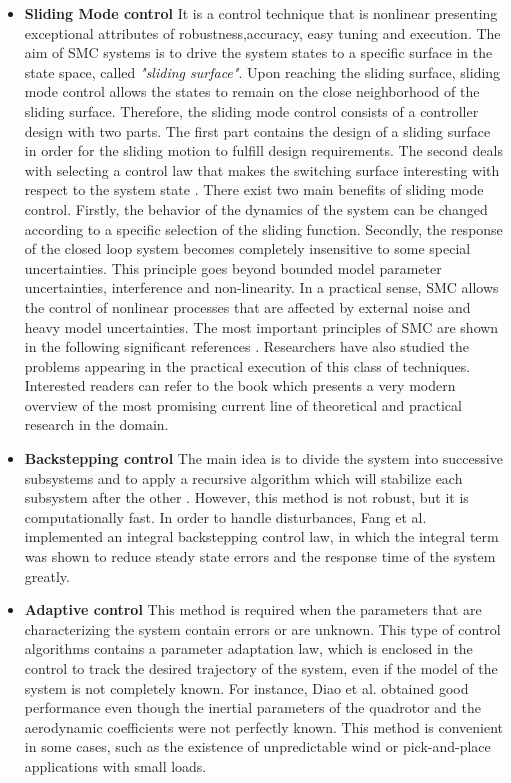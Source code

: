 \documentclass{thesisreport}
\begin{document}
\begin{itemize}
\setlength{\itemindent}{-.5in}

	\item [] \textbf{Sliding Mode control} It is a control technique that is nonlinear presenting exceptional attributes of robustness,accuracy, easy tuning and execution. The aim of SMC systems is to drive the system states to a specific surface in the state space, called  \textit{"sliding surface"}. Upon reaching the sliding surface, sliding mode control allows the states to remain on the close neighborhood of the sliding surface. Therefore, the sliding mode control consists of a controller design with two parts. The first part contains the design of a sliding surface in order for the sliding motion to fulfill design requirements. The second deals with selecting a control law that makes the switching surface interesting with respect to the system state \cite{Utkin1997}.
There exist two main benefits of sliding mode control. Firstly, the behavior of the dynamics of the system can be changed according to a specific selection of the sliding function. Secondly, the response of the closed loop system becomes completely insensitive to some special uncertainties. This principle goes beyond bounded model parameter uncertainties, interference and non-linearity. In a practical sense, SMC allows the control of nonlinear processes that are affected by external noise and heavy model uncertainties.
The most important principles of SMC are shown in the following significant references \cite{Utkin1997,DeCarlo1998,Hung1993}. Researchers have also studied the problems appearing in the practical execution of this class of techniques. \cite{Young1999}
Interested readers can refer to the book \cite{Bartolini2008} which presents a very modern overview of the most promising current line of theoretical and practical research in the domain.

	\item [] \textbf{Backstepping control} The main idea is to divide the system into successive subsystems and to apply a recursive algorithm which will stabilize each subsystem after the other \cite{Madani2006}. However, this method is not robust, but it is computationally fast. In order to handle disturbances, Fang et al. \cite{Gao2011} implemented an integral backstepping control law, in which the integral term was shown to reduce steady state errors and the response time of the system greatly. 

	\item [] \textbf{Adaptive control} This method is required when the parameters that are characterizing the system contain errors or are unknown. This type of control algorithms contains a parameter adaptation law, which is enclosed in the control to track the desired trajectory of the system, even if the model of the system is not completely known.
For instance, Diao et al. \cite{Diao2011} obtained good performance even though the inertial parameters of the quadrotor and the aerodynamic coefficients were not perfectly known. This method is convenient in some cases, such as the existence of unpredictable wind \cite{Antonelli2013} or pick-and-place applications with small loads. 
	 

\end{itemize}
\end{document}
